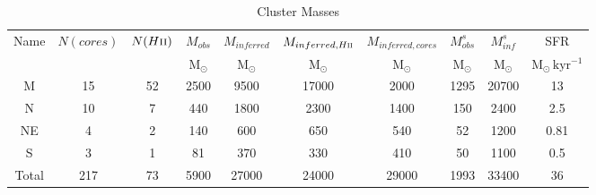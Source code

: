 \begin{table*}[htp]
\centering
\caption{Cluster Masses}
\begin{tabular}{cccccccccc}
\label{tab:clustermassestimates}
Name & $N(cores)$ & $N(H\textsc{ii})$ & $M_{obs}$ & $M_{inferred}$ & $M_{inferred, H\textsc{ii}}$ & $M_{inferred, cores}$ & $M_{obs}^s$ & $M_{inf}^s$ & SFR \\
 &  &  & $\mathrm{M_{\odot}}$ & $\mathrm{M_{\odot}}$ & $\mathrm{M_{\odot}}$ & $\mathrm{M_{\odot}}$ & $\mathrm{M_{\odot}}$ & $\mathrm{M_{\odot}}$ & $\mathrm{M_{\odot}\,kyr^{-1}}$ \\
\hline
M & 15 & 52 & 2500 & 9500 & 17000 & 2000 & 1295 & 20700 & 13 \\
N & 10 & 7 & 440 & 1800 & 2300 & 1400 & 150 & 2400 & 2.5 \\
NE & 4 & 2 & 140 & 600 & 650 & 540 & 52 & 1200 & 0.81 \\
S & 3 & 1 & 81 & 370 & 330 & 410 & 50 & 1100 & 0.5 \\
Total & 217 & 73 & 5900 & 27000 & 24000 & 29000 & 1993 & 33400 & 36 \\
\hline
\end{tabular}
\end{table*}
